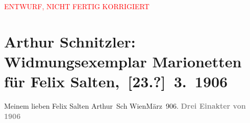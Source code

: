 
\begin{center}
            \textcolor{red}{ENTWURF, NICHT FERTIG KORRIGIERT}
                      \end{center}
            
         
         \renewcommand{\erwaehntePersonen}{Personen: Felix Salten}
         \renewcommand{\erwaehnteInstitutionen}{Institutionen: S. Fischer Verlag}
         \renewcommand{\erwaehnteOrte}{Orte: Berlin, Wien}
         \renewcommand{\erwaehnteWerke}{Werke: Marionetten. Drei Einakter}
               \section[ Arthur Schnitzler: Widmungsexemplar Marionetten für Felix Salten, {[}23.?{]} 3. 1906]{ Arthur Schnitzler: Widmungsexemplar Marionetten für Felix
               Salten, {[}23.?{]} 3. 1906}\nopagebreak{}\rehead{ }\begin{ledgroupsized}[t]{13cm}\normalsize\beginnumbering \toendnotes[C]{\smallbreak\pagebreak[2]} 
\pstart
           \noindent{}{\pb}Meinem lieben Felix Salten\pend
           \pstart \spacefill\mbox{Arthur Sch}\pend{}\pstart
           WienMärz 906.\pend
           {\bigskip}\pstart
           \noindent{}\centering{}{\pb}\textcolor{gray}{\textbf{}}\pend
           \pstart
           \noindent{}\centering{}\textcolor{gray}{\textbf{Drei Einakter von}}{\\}\textcolor{gray}{\textbf{}}\pend
           {\bigskip}\pstart
           \noindent{}\centering{}\textcolor{gray}{\textbf{\so{,{ }}}}\pend
           \pstart
           \noindent{}\centering{}\textcolor{gray}{\textbf{1906}}\pend
           
         
         \endnumbering{}\end{ledgroupsized}  \newcommand{\dateiname}{L03611}\newcommand{\titel}{Arthur Schnitzler: Widmungsexemplar Marionetten für Felix Salten, [23.?] 3. 1906}\newcommand{\editorInnen}{Martin Anton Müller und Laura Untner}
      